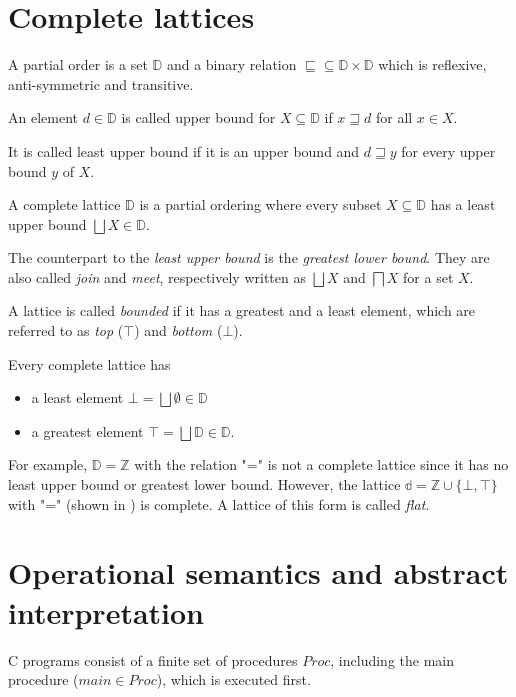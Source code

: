 \section{Complete lattices}
\begin{definition}A partial order is a set $\mathbb{D}$ and a binary relation $\sqsubseteq \subseteq \mathbb{D} \times \mathbb{D}$ which is reflexive, anti-symmetric and transitive.
\end{definition}
\begin{definition}
An element $d \in \mathbb{D}$ is called upper bound for $X \subseteq \mathbb{D}$ if $x \sqsupseteq d$ for all $x \in X$.

It is called least upper bound if it is an upper bound and $d \sqsupseteq y$ for every upper bound $y$ of $X$.
\end{definition}
\begin{definition}
A complete lattice $\mathbb{D}$ is a partial ordering where every subset $X \subseteq \mathbb{D}$ has a least upper bound $\bigsqcup X \in \mathbb{D}$.
\end{definition}
The counterpart to the \textit{least upper bound} is the \textit{greatest lower bound}. They are also called \textit{join} and \textit{meet}, respectively written as $\bigsqcup X$ and $\bigsqcap X$ for a set $X$.

A lattice is called \textit{bounded} if it has a greatest and a least element, which are referred to as \textit{top} ($\top$) and \textit{bottom} ($\bot$).

Every complete lattice has
\begin{itemize}
\item a least element $\bot = \bigsqcup \emptyset \in \mathbb{D}$
\item a greatest element $\top = \bigsqcup \mathbb{D} \in \mathbb{D}$.
\end{itemize}

For example, $\mathbb{D} = \mathbb{Z}$ with the relation "=" is not a complete lattice since it has no least upper bound or greatest lower bound. However, the lattice $\mathbb{d} = \mathbb{Z} \cup \{\bot, \top\}$ with "=" (shown in ) is complete. A lattice of this form is called \textit{flat}.



\section{Operational semantics and abstract interpretation}
C programs consist of a finite set of procedures $Proc$, including the main procedure ($main \in Proc$), which is executed first.

